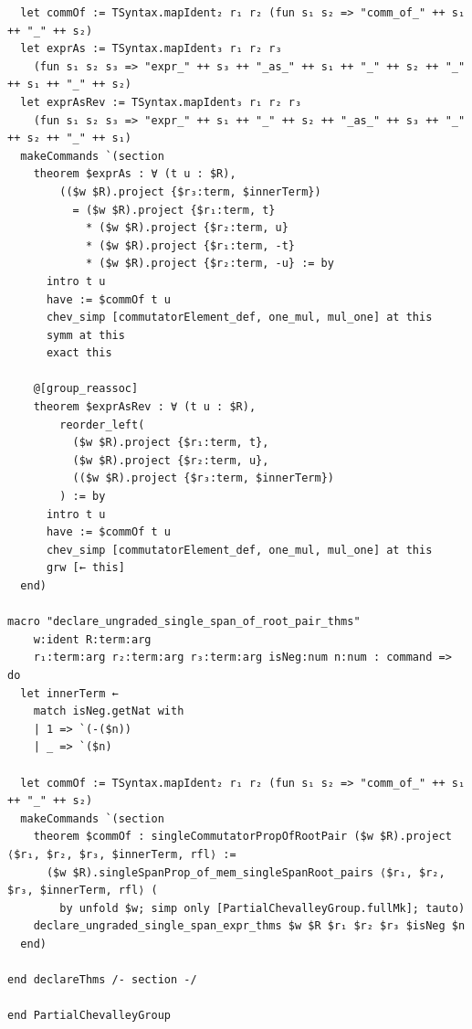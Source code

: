 \begin{Verbatim}
  let commOf := TSyntax.mapIdent₂ r₁ r₂ (fun s₁ s₂ => "comm_of_" ++ s₁ ++ "_" ++ s₂)
  let exprAs := TSyntax.mapIdent₃ r₁ r₂ r₃
    (fun s₁ s₂ s₃ => "expr_" ++ s₃ ++ "_as_" ++ s₁ ++ "_" ++ s₂ ++ "_" ++ s₁ ++ "_" ++ s₂)
  let exprAsRev := TSyntax.mapIdent₃ r₁ r₂ r₃
    (fun s₁ s₂ s₃ => "expr_" ++ s₁ ++ "_" ++ s₂ ++ "_as_" ++ s₃ ++ "_" ++ s₂ ++ "_" ++ s₁)
  makeCommands `(section
    theorem $exprAs : ∀ (t u : $R),
        (($w $R).project {$r₃:term, $innerTerm})
          = ($w $R).project {$r₁:term, t}
            * ($w $R).project {$r₂:term, u}
            * ($w $R).project {$r₁:term, -t}
            * ($w $R).project {$r₂:term, -u} := by
      intro t u
      have := $commOf t u
      chev_simp [commutatorElement_def, one_mul, mul_one] at this
      symm at this
      exact this

    @[group_reassoc]
    theorem $exprAsRev : ∀ (t u : $R),
        reorder_left(
          ($w $R).project {$r₁:term, t},
          ($w $R).project {$r₂:term, u},
          (($w $R).project {$r₃:term, $innerTerm})
        ) := by
      intro t u
      have := $commOf t u
      chev_simp [commutatorElement_def, one_mul, mul_one] at this
      grw [← this]
  end)

macro "declare_ungraded_single_span_of_root_pair_thms"
    w:ident R:term:arg
    r₁:term:arg r₂:term:arg r₃:term:arg isNeg:num n:num : command => do
  let innerTerm ←
    match isNeg.getNat with
    | 1 => `(-($n))
    | _ => `($n)

  let commOf := TSyntax.mapIdent₂ r₁ r₂ (fun s₁ s₂ => "comm_of_" ++ s₁ ++ "_" ++ s₂)
  makeCommands `(section
    theorem $commOf : singleCommutatorPropOfRootPair ($w $R).project ⟨$r₁, $r₂, $r₃, $innerTerm, rfl⟩ :=
      ($w $R).singleSpanProp_of_mem_singleSpanRoot_pairs ⟨$r₁, $r₂, $r₃, $innerTerm, rfl⟩ (
        by unfold $w; simp only [PartialChevalleyGroup.fullMk]; tauto)
    declare_ungraded_single_span_expr_thms $w $R $r₁ $r₂ $r₃ $isNeg $n
  end)

end declareThms /- section -/

end PartialChevalleyGroup
\end{Verbatim}
